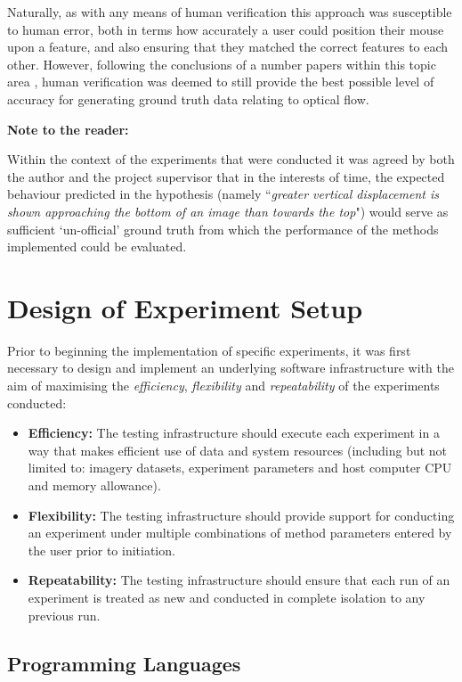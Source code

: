 Naturally, as with any means of human verification this approach was susceptible to human error, both in terms how accurately a user could position their mouse upon a feature, and also ensuring that they matched the correct features to each other. However, following the conclusions of a number papers within this topic area \cite{kondermann} \cite{haltakov} \cite{}, human verification was deemed to still provide the best possible level of accuracy for generating ground truth data relating to optical flow.

\textbf{Note to the reader:}

Within the context of the experiments that were conducted it was agreed by both the author and the project supervisor that in the interests of time, the expected behaviour predicted in the hypothesis (namely  ``\textit{greater vertical displacement is shown approaching the bottom of an image than towards the top}") would serve as sufficient `un-official' ground truth from which the performance of the methods implemented could be evaluated.

\section{Design of Experiment Setup}

Prior to beginning the implementation of specific experiments, it was first necessary to design and implement an underlying software infrastructure with the aim of maximising the \textit{efficiency}, \textit{flexibility} and \textit{repeatability} of the experiments conducted:

\begin{itemize}
	\item \textbf{Efficiency:} The testing infrastructure should execute each experiment in a way that makes efficient use of data and system resources (including but not limited to: imagery datasets, experiment parameters and host computer CPU and memory allowance).
	\item \textbf{Flexibility:} The testing infrastructure should provide support for conducting an experiment under multiple combinations of method parameters entered by the user prior to initiation.  
	\item \textbf{Repeatability:} The testing infrastructure should ensure that each run of an experiment is treated as new and conducted in complete isolation to any previous run. 
\end{itemize}

\subsection{Programming Languages}

